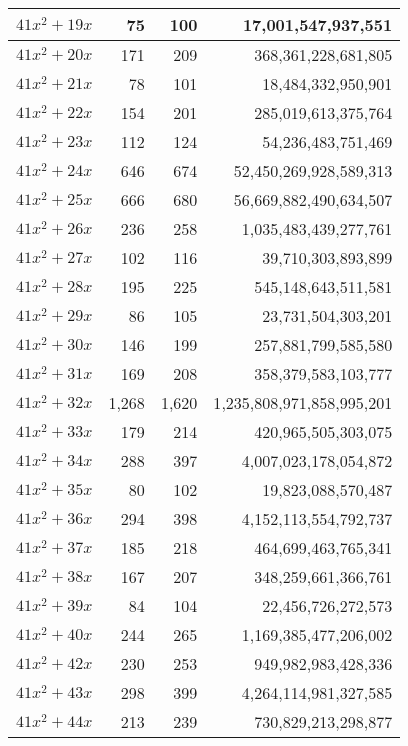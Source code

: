 \documentclass[a4paper]{amsproc}
\theoremstyle{plain}
\theoremstyle{named}
\begin{document}
\begin{longtable}{ | l | r | r | r | }
$41x^2 + 19x$ & 75 & 100 & 17{,}001{,}547{,}937{,}551 \\ \hline
$41x^2 + 20x$ & 171 & 209 & 368{,}361{,}228{,}681{,}805 \\ \hline
$41x^2 + 21x$ & 78 & 101 & 18{,}484{,}332{,}950{,}901 \\ \hline
$41x^2 + 22x$ & 154 & 201 & 285{,}019{,}613{,}375{,}764 \\ \hline
$41x^2 + 23x$ & 112 & 124 & 54{,}236{,}483{,}751{,}469 \\ \hline
$41x^2 + 24x$ & 646 & 674 & 52{,}450{,}269{,}928{,}589{,}313 \\ \hline
$41x^2 + 25x$ & 666 & 680 & 56{,}669{,}882{,}490{,}634{,}507 \\ \hline
$41x^2 + 26x$ & 236 & 258 & 1{,}035{,}483{,}439{,}277{,}761 \\ \hline
$41x^2 + 27x$ & 102 & 116 & 39{,}710{,}303{,}893{,}899 \\ \hline
$41x^2 + 28x$ & 195 & 225 & 545{,}148{,}643{,}511{,}581 \\ \hline
$41x^2 + 29x$ & 86 & 105 & 23{,}731{,}504{,}303{,}201 \\ \hline
$41x^2 + 30x$ & 146 & 199 & 257{,}881{,}799{,}585{,}580 \\ \hline
$41x^2 + 31x$ & 169 & 208 & 358{,}379{,}583{,}103{,}777 \\ \hline
$41x^2 + 32x$ & 1{,}268 & 1{,}620 & 1{,}235{,}808{,}971{,}858{,}995{,}201 \\ \hline
$41x^2 + 33x$ & 179 & 214 & 420{,}965{,}505{,}303{,}075 \\ \hline
$41x^2 + 34x$ & 288 & 397 & 4{,}007{,}023{,}178{,}054{,}872 \\ \hline
$41x^2 + 35x$ & 80 & 102 & 19{,}823{,}088{,}570{,}487 \\ \hline
$41x^2 + 36x$ & 294 & 398 & 4{,}152{,}113{,}554{,}792{,}737 \\ \hline
$41x^2 + 37x$ & 185 & 218 & 464{,}699{,}463{,}765{,}341 \\ \hline
$41x^2 + 38x$ & 167 & 207 & 348{,}259{,}661{,}366{,}761 \\ \hline
$41x^2 + 39x$ & 84 & 104 & 22{,}456{,}726{,}272{,}573 \\ \hline
$41x^2 + 40x$ & 244 & 265 & 1{,}169{,}385{,}477{,}206{,}002 \\ \hline
$41x^2 + 42x$ & 230 & 253 & 949{,}982{,}983{,}428{,}336 \\ \hline
$41x^2 + 43x$ & 298 & 399 & 4{,}264{,}114{,}981{,}327{,}585 \\ \hline
$41x^2 + 44x$ & 213 & 239 & 730{,}829{,}213{,}298{,}877 \\ \hline

\end{longtable}
\end{document}
